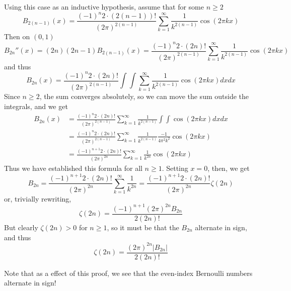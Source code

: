 \documentclass[12pt]{article}
\begin{document}
Using this case as an inductive hypothesis, assume that for some $n\geq 2$
\[B_{2(n-1)}(x)=\frac{(-1)^n2\cdot(2(n-1))!}{(2\pi)^{2(n-1)}}\sum_{k=1}^{\infty}\frac{1}{k^{2(n-1)}}\cos(2\pi k x)\]
Then on $(0,1)$
\[B_{2n}''(x)=(2n)(2n-1)B_{2(n-1)}(x) = \frac{(-1)^n2\cdot(2n)!}{(2\pi)^{2(n-1)}}\sum_{k=1}^{\infty}\frac{1}{k^{2(n-1)}}\cos(2\pi k x)\]
and thus
\[B_{2n}(x) = \frac{(-1)^n2\cdot(2n)!}{(2\pi)^{2(n-1)}}\int\int\sum_{k=1}^{\infty}\frac{1}{k^{2(n-1)}}\cos(2\pi k x)dx dx\]
Since $n\geq 2$, the sum converges absolutely, so we can move the sum outside the integrals, and we get
\begin{align*}
B_{2n}(x) &= \frac{(-1)^n2\cdot(2n)!}{(2\pi)^{2(n-1)}}\sum_{k=1}^{\infty}\frac{1}{k^{2(n-1)}}\int\int\cos(2\pi k x)dx dx\\
&=\frac{(-1)^n2\cdot(2n)!}{(2\pi)^{2(n-1)}}\sum_{k=1}^{\infty}\frac{1}{k^{2(n-1)}}\frac{-1}{4\pi^2k^2}\cos(2\pi k x)\\
&=\frac{(-1)^{n+1}2\cdot(2n)!}{(2\pi)^{2n}}\sum_{k=1}^{\infty}\frac{1}{k^{2n}}\cos(2\pi k x)
\end{align*}
Thus we have established this formula for all $n\geq 1$. Setting $x=0$, then, we get
\[B_{2n} = \frac{(-1)^{n+1}2\cdot(2n)!}{(2\pi)^{2n}}\sum_{k=1}^{\infty}\frac{1}{k^{2n}}=\frac{(-1)^{n+1}2\cdot(2n)!}{(2\pi)^{2n}}\zeta(2n)\]
or, trivially rewriting,
\[\zeta(2n) = \frac{(-1)^{n+1}(2\pi)^{2n}B_{2n}}{2(2n)!}\]
But clearly $\zeta(2n)>0$ for $n\geq 1$, so it must be that the $B_{2n}$ alternate in sign, and thus
\[\zeta(2n) = \frac{(2\pi)^{2n}\lvert B_{2n}\rvert}{2(2n)!}\]

Note that as a  effect of this proof, we see that the even-index Bernoulli numbers alternate in sign!
\end{document}
